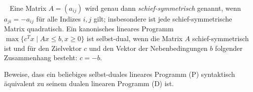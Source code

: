 \documentclass{uebung_cs}
\begin{document}
\begin{exercise}\
	Eine Matrix $A = (a_{ij})$ wird genau dann \emph{schief-symmetrisch} genannt, wenn $a_{ji} = -a_{ij}$ für alle Indizes $i, j$ gilt; insbesondere ist jede schief-symmetrische Matrix quadratisch. Ein kanonisches lineares Programm ${\max\{c^T x  \; | \; Ax \leq b, x \geq 0\}}$ ist selbst-dual, wenn die Matrix $A$ schief-symmetrisch ist und für den Zielvektor $c$ und den Vektor der Nebenbedingungen $b$ folgender Zusammenhang besteht: $c = -b$.
	
	Beweise, dass ein beliebiges selbst-duales lineares Programm (P) syntaktisch äquivalent zu seinem dualen linearen Programm (D) ist.
\end{exercise}
\end{document}
